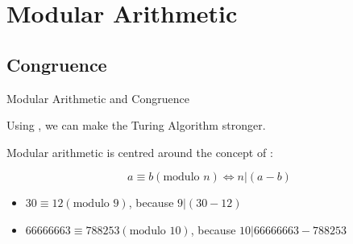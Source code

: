 \section{Modular Arithmetic}




\subsection{Congruence}
\begin{frame}{Modular Arithmetic and Congruence}

  Using , we can make the Turing Algorithm stronger.\bigskip

  Modular arithmetic is centred around the concept of :

  \begin{equation*}
    a\equiv b (\text{modulo } n) \iff n|(a-b)
  \end{equation*}\bigskip

  \begin{itemize}
\item $30\equiv12 (\text{modulo } 9)$,\hspace{4.3cm} because $9|(30-12)$
\item $66666663 \equiv 788253 (\text{modulo } 10)$,\hspace{2cm} because $10|66666663 - 788253$
  \end{itemize}
\end{frame}

